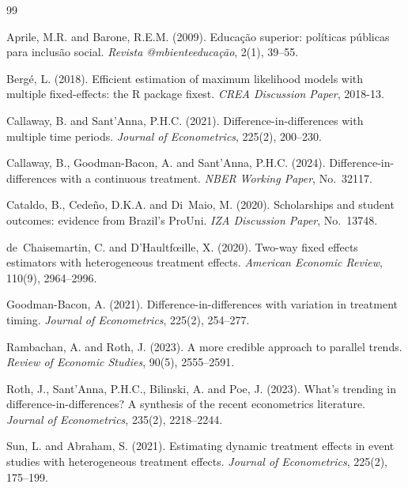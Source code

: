\documentclass[a4paper,11pt]{article}
\begin{document}
\begingroup
\renewcommand{\section}[2]{}
\begin{thebibliography}{99}

Aprile, M.R. and Barone, R.E.M. (2009).
\newblock Educa\c{c}\~ao superior: pol\'iticas p\'ublicas para inclus\~ao social.
\newblock \textit{Revista @mbienteeduca\c{c}\~ao}, 2(1), 39--55.

Berg\'e, L. (2018).
\newblock Efficient estimation of maximum likelihood models with multiple fixed-effects: the R package fixest.
\newblock \textit{CREA Discussion Paper}, 2018-13.


Callaway, B. and Sant'Anna, P.H.C. (2021).
\newblock Difference-in-differences with multiple time periods.
\newblock \textit{Journal of Econometrics}, 225(2), 200--230.

Callaway, B., Goodman-Bacon, A. and Sant'Anna, P.H.C. (2024).
\newblock Difference-in-differences with a continuous treatment.
\newblock \textit{NBER Working Paper}, No.\ 32117.

Cataldo, B., Cede\~no, D.K.A. and Di~Maio, M. (2020).
\newblock Scholarships and student outcomes: evidence from Brazil's ProUni.
\newblock \textit{IZA Discussion Paper}, No.\ 13748.

de~Chaisemartin, C. and D'Haultf\oe ille, X. (2020).
\newblock Two-way fixed effects estimators with heterogeneous treatment effects.
\newblock \textit{American Economic Review}, 110(9), 2964--2996.

Goodman-Bacon, A. (2021).
\newblock Difference-in-differences with variation in treatment timing.
\newblock \textit{Journal of Econometrics}, 225(2), 254--277.

Rambachan, A. and Roth, J. (2023).
\newblock A more credible approach to parallel trends.
\newblock \textit{Review of Economic Studies}, 90(5), 2555--2591.

Roth, J., Sant'Anna, P.H.C., Bilinski, A. and Poe, J. (2023).
\newblock What's trending in difference-in-differences? A synthesis of the recent econometrics literature.
\newblock \textit{Journal of Econometrics}, 235(2), 2218--2244.

Sun, L. and Abraham, S. (2021).
\newblock Estimating dynamic treatment effects in event studies with heterogeneous treatment effects.
\newblock \textit{Journal of Econometrics}, 225(2), 175--199.

\end{thebibliography}
\endgroup
\end{document}
